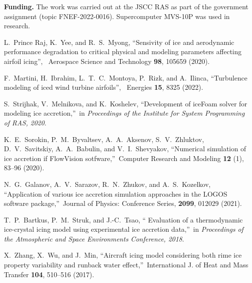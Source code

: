 \documentclass[
11pt,%
tightenlines,%
twoside,%
onecolumn,%
nofloats,%
nobibnotes,%
nofootinbib,%
superscriptaddress,%
noshowpacs,%
centertags]%
{revtex4-2}
\begin{document}
{\bf Funding.} The work was carried out at the JSCC RAS as part of
the government assignment (topic FNEF-2022-0016). Supercomputer
MVS-10P was used in research.


\begin{thebibliography}{99}


 L.~Prince Raj, K.~Yee, and R.~S.~Myong,
\textquotedblleft Sensivity of  ice and aerodynamic performance
degradation to critical physical and modeling parameters affecting
airfoil icing\textquotedblright, \ Aerospace Science and Technology
{\bf 98}, 105659 (2020).

 F.~Martini, H.~Ibrahim, L.~T.~C.~Montoya, P.~Rizk,
and A.~Ilinca, \textquotedblleft Turbulence  modeling of iced wind
turbine airfoils\textquotedblright, \ Energies {\bf 15}, 8325
(2022).

 S.~Strijhak, V.~Melnikova, and K.~Koshelev,
\textquotedblleft Development of iceFoam  solver for modeling ice
accretion,\textquotedblright \ in \textit{Proceedings of the
Institute for System Programming of RAS, 2020}.

 K.~E.~Sorokin, P.~M.~Byvaltsev, A.~A.~Aksenov,
S.~V.~Zhluktov, D.~V.~Savitskiy, A.~A.~Babulin,  and
V.~I.~Shevyakov, \textquotedblleft Numerical simulation of ice
accretion if FlowVision sotfware,\textquotedblright \ Computer
Research and Modeling {\bf 12} (1), 83--96 (2020).

N.~G.~Galanov, A.~V.~Sarazov, R.~N.~Zhukov, and A.~S.~Kozelkov, \textquotedblleft Application of various ice accretion simulation approaches in the LOGOS software package,\textquotedblright \ Journal of Physics: Conference Series, {\bf 2099}, 012029 (2021).

T.~P.~Bartkus, P.~M.~Struk, and J.-C.~Tsao, \textquotedblleft
Evaluation of  a thermodynamic ice-crystal icing model using
experimental ice accretion data,\textquotedblright \ in
\textit{Proceedings of the Atmospheric and Space Environments
Conference, 2018}.

X.~Zhang, X.~Wu, and J.~Min, \textquotedblleft Aircraft icing  model
considering both rime ice property variability and runback water
effect,\textquotedblright \ International J. of Heat and Mass
Transfer {\bf 104}, 510--516 (2017).


\end{thebibliography}
\end{document}
